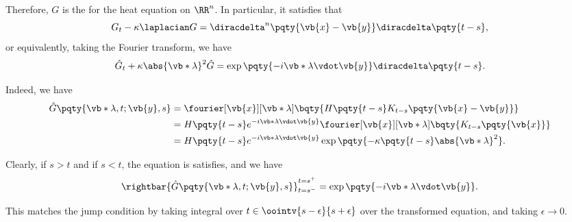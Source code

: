 Therefore, \(G\) is the  for the heat equation on \(\RR^n\). In particular, it satisfies that
\begin{equation}
    G_t - \kappa \laplacian G = \diracdelta^n \pqty{\vb{x} - \vb{y}} \diracdelta\pqty{t - s},
\end{equation}
or equivalently, taking the Fourier transform, we have
\begin{equation}
    \hat{G}_t + \kappa \abs{\vb*{\lambda}}^2 \hat{G} = \exp\pqty{- i \vb*{\lambda} \vdot \vb{y}} \diracdelta\pqty{t - s}.
\end{equation}

Indeed, we have
\begin{subequations}
    \begin{align}
        \hat{G}\pqty{\vb*{\lambda}, t; \vb{y}, s} &= \fourier[\vb{x}][\vb*{\lambda}] \bqty{H\pqty{t - s} K_{t - s} \pqty{\vb{x} - \vb{y}}} \\
        &= H\pqty{t - s} e^{- i \vb*{\lambda} \vdot \vb{y}} \fourier[\vb{x}][\vb*{\lambda}] \bqty{K_{t - s} \pqty{\vb{x}}} \\
        &= H\pqty{t - s} e^{- i \vb*{\lambda} \vdot \vb{y}} \exp\pqty{- \kappa \pqty{t - s} \abs{\vb*{\lambda}}^2}.
    \end{align}
\end{subequations}

Clearly, if \(s > t\) and if \(s < t\), the equation is satisfies, and we have
\begin{equation}
    \rightbar{\hat{G}\pqty{\vb*{\lambda}, t; \vb{y}, s}}_{t = s^-}^{t = s^+} = \exp\pqty{- i \vb*{\lambda} \vdot \vb{y}}.
\end{equation}

This matches the jump condition by taking integral over \(t \in \oointv{s - \epsilon}{s + \epsilon}\) over the transformed equation, and taking \(\epsilon \to 0\).